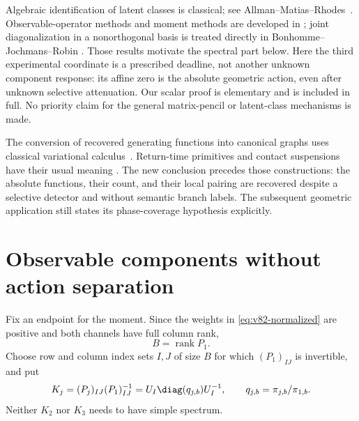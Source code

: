 Algebraic identification of latent classes is classical; see
Allman--Matias--Rhodes~\cite{V81AllmanMatiasRhodes}. Observable-operator
methods and moment methods are developed in
\cite{V81AnandkumarHsuKakade}; joint diagonalization in a nonorthogonal
basis is treated directly in Bonhomme--Jochmans--Robin
\cite{V82BonhommeJoint}. Those results motivate the spectral part below.
Here the third experimental coordinate is a prescribed deadline, not
another unknown component response: its affine zero is the absolute
geometric action, even after unknown selective attenuation.
Our scalar proof is elementary and is included in full. No priority
claim for the general matrix-pencil or latent-class mechanisms is made.

The conversion of recovered generating functions into canonical graphs
uses classical variational calculus~\cite{MarsdenWest2001,LallWest2006}.
Return-time primitives and contact suspensions have their usual meaning
\cite{Hutchings2016,V81Geiges2008}. The new conclusion precedes those
constructions: the absolute functions, their count, and their local
pairing are recovered despite a selective detector and without semantic
branch labels. The subsequent geometric application still states its
phase-coverage hypothesis explicitly.

\section{Observable components without action separation}
\label{sec:v82-components}

Fix an endpoint for the moment. Since the weights in
\eqref{eq:v82-normalized} are positive and both channels have full
column rank,
\begin{equation}\label{eq:v82-rank}
                         B=\operatorname{rank}P_1.
\end{equation}
Choose row and column index sets $I,J$ of size $B$ for which
$(P_1)_{IJ}$ is invertible, and put
\begin{equation}\label{eq:v82-operators}
 K_j=(P_j)_{IJ}(P_1)_{IJ}^{-1}
     =U_I\diag(q_{j,b})U_I^{-1},\qquad
 q_{j,b}=\pi_{j,b}/\pi_{1,b}.
\end{equation}
Neither $K_2$ nor $K_3$ needs to have simple spectrum.

